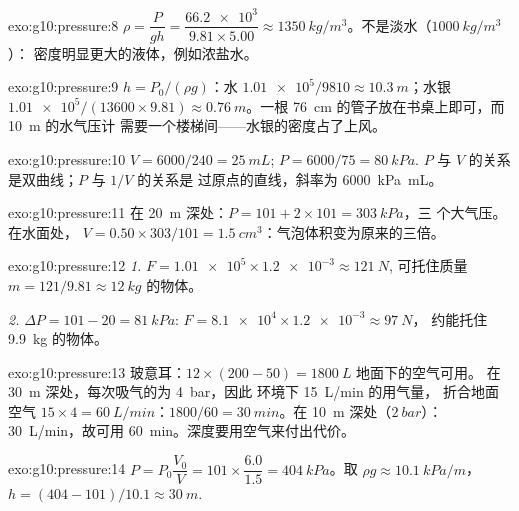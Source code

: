 \begin{solution}{exo:g10:pressure:8}
$\rho = \dfrac{P}{g h} = \dfrac{\num{66.2e3}}{9.81 \times 5.00}
\approx \qty{1350}{kg/m^3}$。不是淡水（$\qty{1000}{kg/m^3}$）：
密度明显更大的液体，例如浓盐水。
\end{solution}

\begin{solution}{exo:g10:pressure:9}
$h = P_0/(\rho g)$：水
$\num{1.01e5}/9810 \approx \qty{10.3}{m}$；水银
$\num{1.01e5}/(13600 \times 9.81) \approx \qty{0.76}{m}$。一根
\qty{76}{cm} 的管子放在书桌上即可，而 \qty{10}{m} 的水气压计
需要一个楼梯间——水银的密度占了上风。
\end{solution}

\begin{solution}{exo:g10:pressure:10}
$V = 6000/240 = \qty{25}{mL}$; $P = 6000/75 = \qty{80}{kPa}$.
$P$ 与 $V$ 的关系是双曲线；$P$ 与 $1/V$ 的关系是
过原点的直线，斜率为 \qty{6000}{kPa.mL}。
\end{solution}

\begin{solution}{exo:g10:pressure:11}
在 \qty{20}{m} 深处：$P = 101 + 2 \times 101 = \qty{303}{kPa}$，三
个大气压。在水面处，
$V = 0.50 \times 303/101 = \qty{1.5}{cm^3}$：气泡体积变为原来的三倍。
\end{solution}

\begin{solution}{exo:g10:pressure:12}
\emph{1.} $F = \num{1.01e5} \times \num{1.2e-3} \approx \qty{121}{N}$,
可托住质量 $m = 121/9.81 \approx \qty{12}{kg}$ 的物体。

\emph{2.} $\Delta P = 101 - 20 = \qty{81}{kPa}$:
$F = \num{8.1e4} \times \num{1.2e-3} \approx \qty{97}{N}$，
约能托住 \qty{9.9}{kg} 的物体。
\end{solution}

\begin{solution}{exo:g10:pressure:13}
玻意耳：$12 \times (200 - 50) = \qty{1800}{L}$ 地面下的空气可用。
在 \qty{30}{m} 深处，每次吸气的为 \qty{4}{bar}，因此
环境下 \qty{15}{L/min} 的用气量，
折合地面空气 $15 \times 4 = \qty{60}{L/min}$：$1800/60 =
\qty{30}{min}$。在 \qty{10}{m} 深处（$\qty{2}{bar}$）：
\qty{30}{L/min}，故可用 \qty{60}{min}。深度要用空气来付出代价。
\end{solution}

\begin{solution}{exo:g10:pressure:14}
$P = P_0 \dfrac{V_0}{V} = 101 \times \dfrac{6.0}{1.5} =
\qty{404}{kPa}$。取 $\rho g \approx \qty{10.1}{kPa/m}$，
$h = (404 - 101)/10.1 \approx \qty{30}{m}$.
\end{solution}

